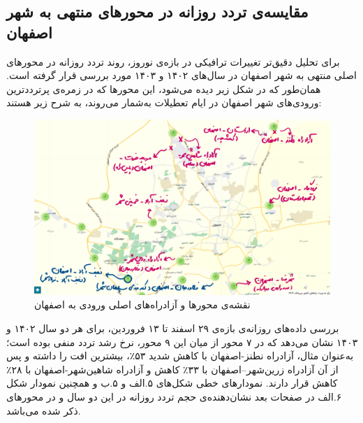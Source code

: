 \documentclass[a4paper, 12pt]{article}
\begin{document}
\subsection{مقایسه‌ی تردد روزانه در محورهای منتهی به شهر اصفهان}
برای تحلیل دقیق‌تر تغییرات ترافیکی در بازه‌ی نوروز، روند تردد روزانه در محورهای اصلی منتهی به شهر اصفهان در سال‌های ۱۴۰۲ و ۱۴۰۳ مورد بررسی قرار گرفته است. همان‌طور که در شکل زیر دیده می‌شود، این محورها که در زمره‌ی پرترددترین ورودی‌های شهر اصفهان در ایام تعطیلات به‌شمار می‌روند، به شرح زیر هستند:
\begin{figure}[htbp]
    \centering
    \includegraphics[width=1\textwidth]{isfahan_141.png}
    \caption{نقشه‌ی محورها و آزادراه‌های اصلی ورودی به اصفهان}
\end{figure}

\vspace{2em}
بررسی داده‌های روزانه‌ی بازه‌ی ۲۹ اسفند تا ۱۳ فروردین، برای هر دو سال ۱۴۰۲ و ۱۴۰۳ نشان می‌دهد که در ۷ محور از میان این ۹ محور، نرخ رشد تردد منفی بوده است؛ به‌عنوان مثال، آزادراه نطنز-اصفهان با کاهش شدید ۵۳٪، بیشترین افت را داشته و پس از آن آزادراه زرین‌شهر–اصفهان با ۳۳٪ کاهش و آزادراه شاهین‌شهر-اصفهان با ۲۸٪ کاهش قرار دارند.
نمودارهای خطی شکل‌های ۵.الف و ۵.ب و همچنین نمودار شکل ۶.الف در صفحات بعد نشان‌دهنده‌ی حجم تردد روزانه در این دو سال و در محورهای ذکر شده می‌باشد.
\end{document}
